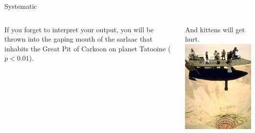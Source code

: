 \documentclass[t]{beamer}
\begin{document}
	\begin{frame}[t]{Systematic }
		\begin{columns}[T]
			If you forget to interpret your output, you will be thrown into the gaping mouth of the sarlaac that inhabits the Great Pit of Carkoon on planet Tatooine ($p < 0.01$).\vspace{1em}
			
			And kittens will get hurt.
			\includegraphics[height=.66\paperheight]{sarlaac.jpg}
		\end{columns}
	\end{frame}
\end{document}
